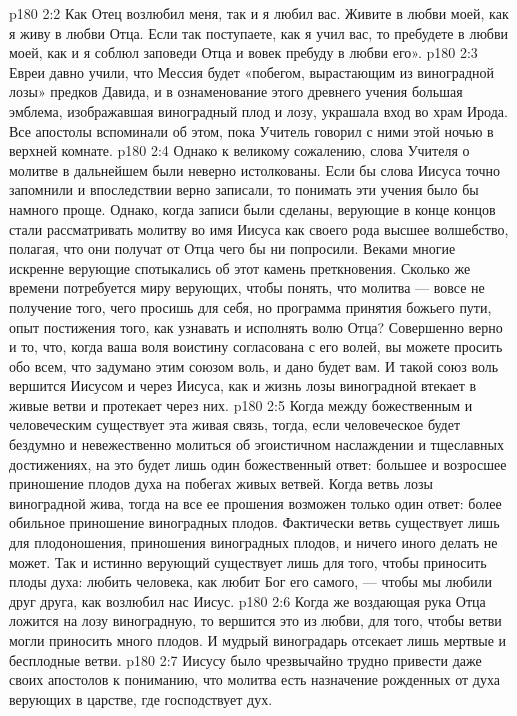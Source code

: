 \vs p180 2:2 Как Отец возлюбил меня, так и я любил вас. Живите в любви моей, как я живу в любви Отца. Если так поступаете, как я учил вас, то пребудете в любви моей, как и я соблюл заповеди Отца и вовек пребуду в любви его».
\vs p180 2:3 Евреи давно учили, что Мессия будет «побегом, вырастающим из виноградной лозы» предков Давида, и в ознаменование этого древнего учения большая эмблема, изображавшая виноградный плод и лозу, украшала вход во храм Ирода. Все апостолы вспоминали об этом, пока Учитель говорил с ними этой ночью в верхней комнате.
\vs p180 2:4 Однако к великому сожалению, слова Учителя о молитве в дальнейшем были неверно истолкованы. Если бы слова Иисуса точно запомнили и впоследствии верно записали, то понимать эти учения было бы намного проще. Однако, когда записи были сделаны, верующие в конце концов стали рассматривать молитву во имя Иисуса как своего рода высшее волшебство, полагая, что они получат от Отца чего бы ни попросили. Веками многие искренне верующие спотыкались об этот камень преткновения. Сколько же времени потребуется миру верующих, чтобы понять, что молитва --- вовсе не получение того, чего просишь для себя, но программа принятия божьего пути, опыт постижения того, как узнавать и исполнять волю Отца? Совершенно верно и то, что, когда ваша воля воистину согласована с его волей, вы можете просить обо всем, что задумано этим союзом воль, и дано будет вам. И такой союз воль вершится Иисусом и через Иисуса, как и жизнь лозы виноградной втекает в живые ветви и протекает через них.
\vs p180 2:5 Когда между божественным и человеческим существует эта живая связь, тогда, если человеческое будет бездумно и невежественно молиться об эгоистичном наслаждении и тщеславных достижениях, на это будет лишь один божественный ответ: большее и возросшее приношение плодов духа на побегах живых ветвей. Когда ветвь лозы виноградной жива, тогда на все ее прошения возможен только один ответ: более обильное приношение виноградных плодов. Фактически ветвь существует лишь для плодоношения, приношения виноградных плодов, и ничего иного делать не может. Так и истинно верующий существует лишь для того, чтобы приносить плоды духа: любить человека, как любит Бог его самого, --- чтобы мы любили друг друга, как возлюбил нас Иисус.
\vs p180 2:6 Когда же воздающая рука Отца ложится на лозу виноградную, то вершится это из любви, для того, чтобы ветви могли приносить много плодов. И мудрый виноградарь отсекает лишь мертвые и бесплодные ветви.
\vs p180 2:7 Иисусу было чрезвычайно трудно привести даже своих апостолов к пониманию, что молитва есть назначение рожденных от духа верующих в царстве, где господствует дух.
